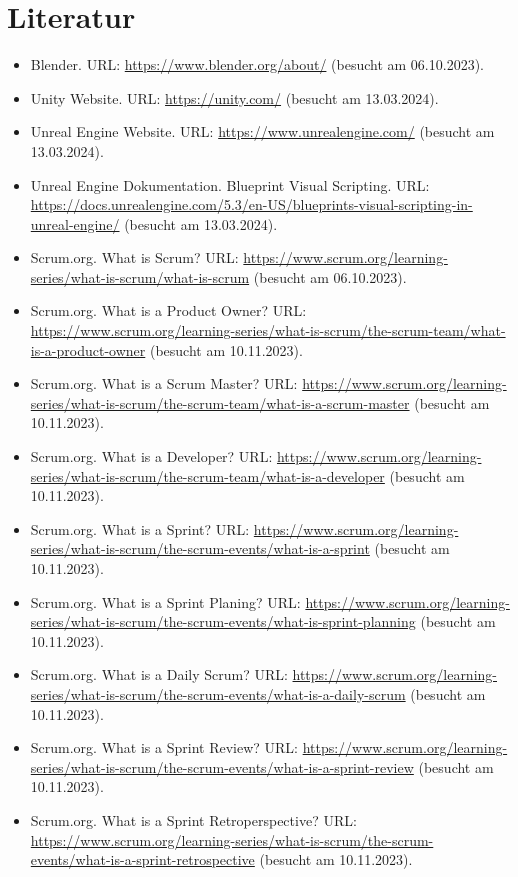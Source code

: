 \chapter{Literatur}

\begin{itemize}
    \item Blender. URL: \url{https://www.blender.org/about/} (besucht am 06.10.2023).
    \item Unity Website. URL: \url{https://unity.com/} (besucht am 13.03.2024).
    \item Unreal Engine Website. URL: \url{https://www.unrealengine.com/} (besucht am 13.03.2024).
    \item Unreal Engine Dokumentation. Blueprint Visual Scripting. URL: \url{https://docs.unrealengine.com/5.3/en-US/blueprints-visual-scripting-in-unreal-engine/} (besucht am 13.03.2024).
    \item Scrum.org. What is Scrum? URL: \url{https://www.scrum.org/learning-series/what-is-scrum/what-is-scrum} (besucht am 06.10.2023).
    \item Scrum.org. What is a Product Owner? URL: \url{https://www.scrum.org/learning-series/what-is-scrum/the-scrum-team/what-is-a-product-owner} (besucht am 10.11.2023).
    \item Scrum.org. What is a Scrum Master? URL: \url{https://www.scrum.org/learning-series/what-is-scrum/the-scrum-team/what-is-a-scrum-master} (besucht am 10.11.2023).
    \item Scrum.org. What is a Developer? URL: \url{https://www.scrum.org/learning-series/what-is-scrum/the-scrum-team/what-is-a-developer} (besucht am 10.11.2023).
    \item Scrum.org. What is a Sprint? URL: \url{https://www.scrum.org/learning-series/what-is-scrum/the-scrum-events/what-is-a-sprint} (besucht am 10.11.2023).
    \item Scrum.org. What is a Sprint Planing? URL: \url{https://www.scrum.org/learning-series/what-is-scrum/the-scrum-events/what-is-sprint-planning} (besucht am 10.11.2023).
    \item Scrum.org. What is a Daily Scrum? URL: \url{https://www.scrum.org/learning-series/what-is-scrum/the-scrum-events/what-is-a-daily-scrum} (besucht am 10.11.2023).
    \item Scrum.org. What is a Sprint Review? URL: \url{https://www.scrum.org/learning-series/what-is-scrum/the-scrum-events/what-is-a-sprint-review} (besucht am 10.11.2023).
    \item Scrum.org. What is a Sprint Retroperspective? URL: \url{https://www.scrum.org/learning-series/what-is-scrum/the-scrum-events/what-is-a-sprint-retrospective} (besucht am 10.11.2023).

\end{itemize}
